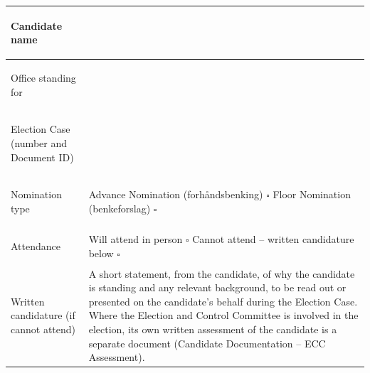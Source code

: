 \documentclass{../../../Common/Latex/Templates/rapport}
\begin{document}
\vspace{0.4cm}
\begin{tabularx}{\textwidth}{|>{\bfseries\raggedright\arraybackslash}p{4.2cm}|X|}
  \hline
  Candidate name                         & \rule{0pt}{1.2cm}                                                                                                                                                                                                                                                                                                                                                                           \\
  \hline
  Office standing for                    & \rule{0pt}{1.2cm}                                                                                                                                                                                                                                                                                                                                                                           \\
  \hline
  Election Case (number and Document ID) & \rule{0pt}{1.2cm}                                                                                                                                                                                                                                                                                                                                                                           \\
  \hline
  Nomination type                        & \rule{0pt}{1.2cm}Advance Nomination (forhåndsbenking) \quad $\square$ \quad Floor Nomination (benkeforslag) \quad $\square$                                                                                                                                                                                                                                                                 \\
  \hline
  Attendance                             & \rule{0pt}{1.2cm}Will attend in person \quad $\square$ \quad Cannot attend -- written candidature below \quad $\square$                                                                                                                                                                                                                                                                     \\
  \hline
  Written candidature (if cannot attend) & \rule{0pt}{3.2cm}A short statement, from the candidate, of why the candidate is standing and any relevant background, to be read out or presented on the candidate's behalf during the Election Case. Where the Election and Control Committee is involved in the election, its own written assessment of the candidate is a separate document (Candidate Documentation -- ECC Assessment). \\

\end{tabularx}
\end{document}
